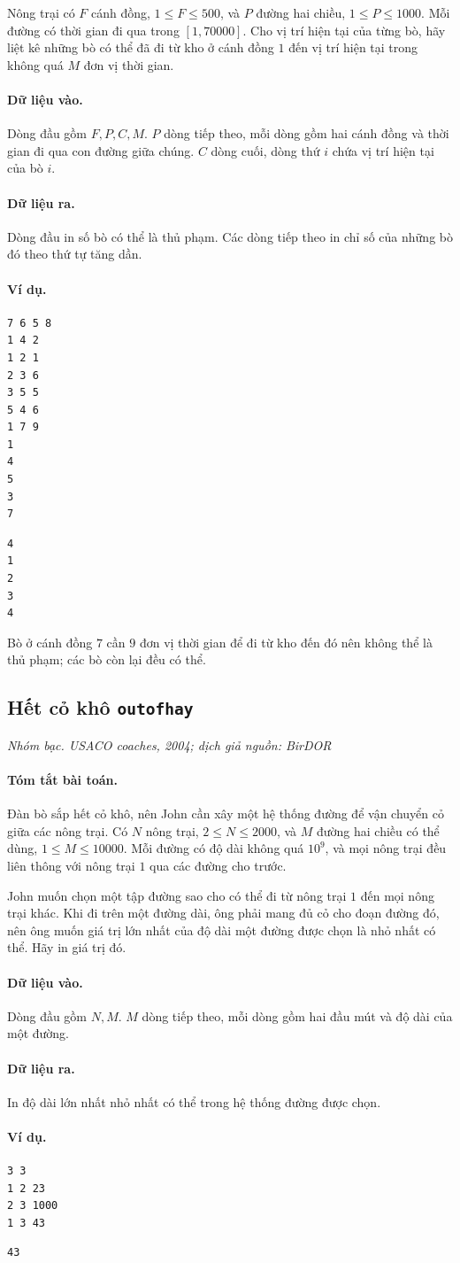 \documentclass[11pt]{article}
\newcommand{\problem}[4]{%
  \subsection[#1 (#2)]{#1 \hfill {\normalsize\texttt{#2}}}%
  \noindent\textit{#3. #4}\par\smallskip
}
\newcommand{\iosec}[1]{\paragraph{#1}}
\begin{document}
Nông trại có \(F\) cánh đồng, \(1\le F\le 500\), và \(P\) đường hai chiều,
\(1\le P\le 1000\). Mỗi đường có thời gian đi qua trong \([1,70000]\). Cho vị
trí hiện tại của từng bò, hãy liệt kê những bò có thể đã đi từ kho ở cánh đồng
\(1\) đến vị trí hiện tại trong không quá \(M\) đơn vị thời gian.

\iosec{Dữ liệu vào.}
Dòng đầu gồm \(F,P,C,M\). \(P\) dòng tiếp theo, mỗi dòng gồm hai cánh đồng và
thời gian đi qua con đường giữa chúng. \(C\) dòng cuối, dòng thứ \(i\) chứa vị
trí hiện tại của bò \(i\).

\iosec{Dữ liệu ra.}
Dòng đầu in số bò có thể là thủ phạm. Các dòng tiếp theo in chỉ số của những
bò đó theo thứ tự tăng dần.

\iosec{Ví dụ.}
\begin{verbatim}
7 6 5 8
1 4 2
1 2 1
2 3 6
3 5 5
5 4 6
1 7 9
1
4
5
3
7
\end{verbatim}

\begin{verbatim}
4
1
2
3
4
\end{verbatim}

Bò ở cánh đồng \(7\) cần \(9\) đơn vị thời gian để đi từ kho đến đó nên không
thể là thủ phạm; các bò còn lại đều có thể.

\problem{Hết cỏ khô}{outofhay}{Nhóm bạc}{USACO coaches, 2004; dịch giả nguồn: BirDOR}

\iosec{Tóm tắt bài toán.}
Đàn bò sắp hết cỏ khô, nên John cần xây một hệ thống đường để vận chuyển cỏ
giữa các nông trại. Có \(N\) nông trại, \(2\le N\le 2000\), và \(M\) đường hai
chiều có thể dùng, \(1\le M\le 10000\). Mỗi đường có độ dài không quá
\(10^9\), và mọi nông trại đều liên thông với nông trại \(1\) qua các đường
cho trước.

John muốn chọn một tập đường sao cho có thể đi từ nông trại \(1\) đến mọi
nông trại khác. Khi đi trên một đường dài, ông phải mang đủ cỏ cho đoạn đường
đó, nên ông muốn giá trị lớn nhất của độ dài một đường được chọn là nhỏ nhất
có thể. Hãy in giá trị đó.

\iosec{Dữ liệu vào.}
Dòng đầu gồm \(N,M\). \(M\) dòng tiếp theo, mỗi dòng gồm hai đầu mút và độ dài
của một đường.

\iosec{Dữ liệu ra.}
In độ dài lớn nhất nhỏ nhất có thể trong hệ thống đường được chọn.

\iosec{Ví dụ.}
\begin{verbatim}
3 3
1 2 23
2 3 1000
1 3 43
\end{verbatim}

\begin{verbatim}
43
\end{verbatim}
\end{document}
